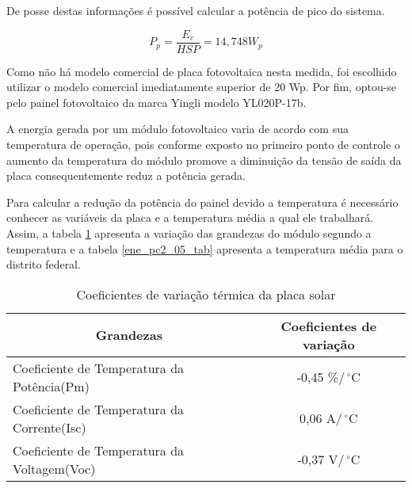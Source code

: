 	De posse destas informações é possível calcular a potência de pico do sistema.
	
\begin{equation}
P_p = \dfrac{E_c}{HSP} = 14,748 W_p
\end{equation}

	Como não há modelo comercial de placa fotovoltaica nesta medida, foi escolhido utilizar o modelo comercial imediatamente superior de 20 Wp. Por fim, optou-se pelo painel fotovoltaico da marca Yingli modelo YL020P-17b. \cite{yingli}

	A energia gerada por um módulo fotovoltaico varia de acordo com sua temperatura de operação, pois conforme exposto no primeiro ponto de controle o aumento da temperatura do módulo promove a diminuição da tensão de saída da placa consequentemente reduz a potência gerada.
	
	Para calcular a redução da potência do painel devido a temperatura é necessário conhecer as variáveis da placa e a temperatura média a qual ele trabalhará. Assim, a tabela \ref{ene_pc2_04_tab} apresenta a variação das grandezas do módulo segundo a temperatura e a tabela \ref{ene_pc2_05_tab} apresenta a temperatura média para o distrito federal. 
	
\begin{table}[H]
\centering
\caption{Coeficientes de variação térmica da placa solar}
{%
\begin{tabular}{|l|c|}
\hline
\multicolumn{1}{|c|}{\textbf{Grandezas}} & \textbf{Coeficientes de variação} \\ \hline
Coeficiente de Temperatura da Potência(Pm) & -0,45 \%/$\,^{\circ}\mathrm{C}$ \\ \hline
Coeficiente de Temperatura da Corrente(Isc) & 0,06 A/$\,^{\circ}\mathrm{C}$ \\ \hline
Coeficiente de Temperatura da Voltagem(Voc) & -0,37 V/$\,^{\circ}\mathrm{C}$ \\ \hline
\end{tabular}%
}
\label{ene_pc2_04_tab}
\end{table}

\begin{table}[H]
\centering
\caption{Temperatura média mensal. \cite{climate}}
\label{ene_pc2_05_tab}
\end{table}

